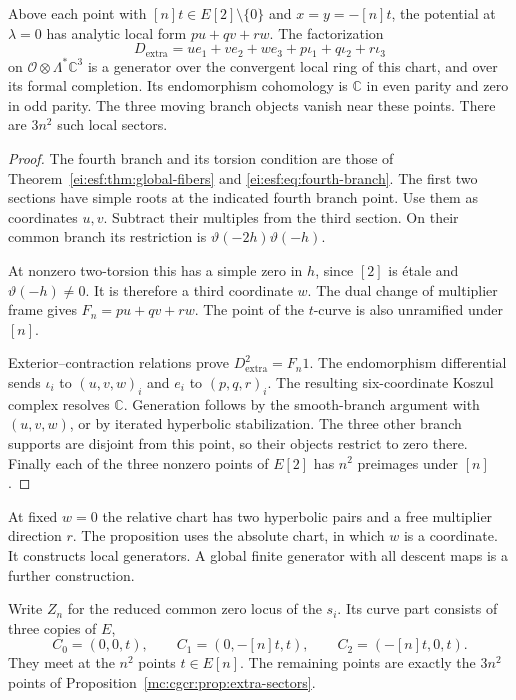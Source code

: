 \begin{proposition}\label{mc:cgcr:prop:extra-sectors}
Above each point with $[n]t\in E[2]\setminus\{0\}$ and
$x=y=-[n]t$, the potential at $\lambda=0$ has analytic
local form $pu+qv+rw$. The factorization
\begin{equation}\label{mc:cgcr:eq:extra}
 D_{\mathrm{extra}}=ue_1+ve_2+we_3
                         +p\iota_1+q\iota_2+r\iota_3
\end{equation}
on $\mathcal O\otimes\Lambda^*\mathbb C^3$ is a generator over the convergent local ring of this
chart, and over its formal completion. Its endomorphism
cohomology is $\mathbb C$ in
even parity and zero in odd parity. The three moving
branch objects vanish near these points. There are
$3n^2$ such local sectors.
\end{proposition}

\begin{proof}
The fourth branch and its torsion condition are those of
Theorem~\ref{ei:esf:thm:global-fibers} and
\eqref{ei:esf:eq:fourth-branch}.
The first two sections have simple roots at the indicated
fourth branch point. Use them as coordinates $u,v$.
Subtract their multiples from the third section. On
their common branch its restriction is
$\vartheta(-2h)\vartheta(-h)$.

At nonzero two-torsion this has a simple zero in $h$,
since $[2]$ is \'{e}tale and $\vartheta(-h)\ne0$.
It is therefore a third coordinate $w$.
The dual change of multiplier frame gives $F_n=pu+qv+rw$.
The point of the $t$-curve is also unramified under $[n]$.

Exterior--contraction relations prove
$D_{\mathrm{extra}}^2=F_n1$.
The endomorphism differential sends
$\iota_i$ to $(u,v,w)_i$ and $e_i$ to $(p,q,r)_i$.
The resulting six-coordinate Koszul complex resolves
$\mathbb C$. Generation follows by the smooth-branch
argument with $(u,v,w)$, or by iterated hyperbolic
stabilization. The three other branch supports are
disjoint from this point, so their objects restrict to
zero there. Finally each of the three nonzero points
of $E[2]$ has $n^2$ preimages under $[n]$.
\end{proof}

At fixed $w=0$ the relative chart has two hyperbolic
pairs and a free multiplier direction $r$. The proposition
uses the absolute chart, in which $w$ is a coordinate.
It constructs local generators. A global finite generator
with all descent maps is a further construction.

Write $Z_n$ for the reduced common zero locus of the $s_i$.
Its curve part consists of three copies of $E$,
\[
 C_0=(0,0,t),\qquad C_1=(0,-[n]t,t),\qquad
 C_2=(-[n]t,0,t).
\]
They meet at the $n^2$ points $t\in E[n]$.
The remaining points are exactly the $3n^2$ points of
Proposition~\ref{mc:cgcr:prop:extra-sectors}.

